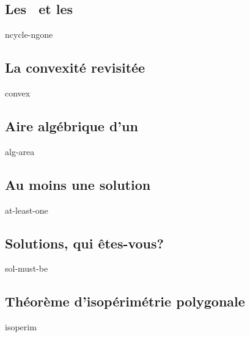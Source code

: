 \documentclass[12pt]{amsart}
\newcommand{\ncycle}{\xcycle{n}}
\newcommand{\ncycles}{\xcycles{n}}
\newcommand{\ngones}{\xgones{n}}
\begin{document}
\subsection{Les \ncycles\ et les \ngones}
{ncycle-ngone}



\subsection{La convexité revisitée}
{convex}


\subsection{Aire algébrique d'un \ncycle}
{alg-area}


\subsection{Au moins une solution}
{at-least-one}


\subsection{Solutions, qui êtes-vous?}
{sol-must-be}


\subsection{Théorème d'isopérimétrie polygonale}
{isoperim}
\end{document}
